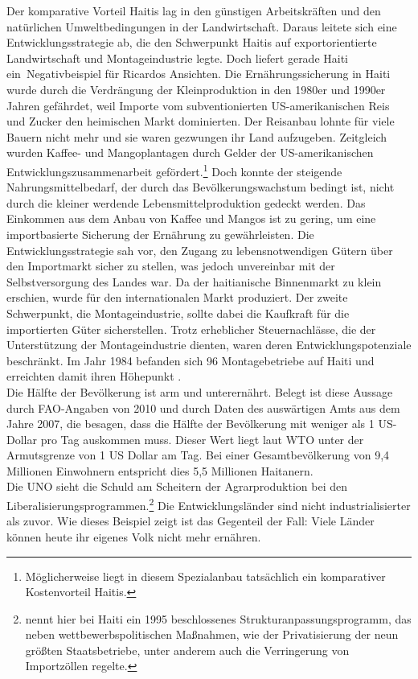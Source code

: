  Der komparative Vorteil Haitis lag in den günstigen Arbeitskräften und den natürlichen Umweltbedingungen in der Landwirtschaft. Daraus leitete sich eine Entwicklungsstrategie ab, die den Schwerpunkt Haitis auf exportorientierte Landwirtschaft und Montageindustrie legte. Doch liefert gerade Haiti ein~Negativbeispiel für Ricardos Ansichten. Die Ernährungssicherung in Haiti wurde durch die Verdrängung der Kleinproduktion in den 1980er und 1990er Jahren gefährdet, weil Importe vom subventionierten US-amerikanischen Reis und Zucker den heimischen Markt dominierten. Der Reisanbau lohnte für viele Bauern nicht mehr und sie waren gezwungen ihr Land aufzugeben. Zeitgleich wurden Kaffee- und Mangoplantagen durch Gelder der US-amerikanischen Entwicklungszusammenarbeit gefördert.\footnote{Möglicherweise liegt in diesem Spezialanbau tatsächlich ein komparativer Kostenvorteil Haitis.} Doch konnte der steigende Nahrungsmittelbedarf, der durch das Bevölkerungswachstum bedingt ist, nicht durch die kleiner werdende Lebensmittelproduktion gedeckt werden. Das Einkommen aus dem Anbau von Kaffee und Mangos ist zu gering, um eine importbasierte Sicherung der Ernährung zu gewährleisten. Die Entwicklungsstrategie sah vor, den Zugang zu lebensnotwendigen Gütern über den Importmarkt sicher zu stellen, was jedoch unvereinbar mit der Selbstversorgung des Landes war. Da der haitianische Binnenmarkt zu klein erschien, wurde für den internationalen Markt produziert. Der zweite Schwerpunkt, die Montageindustrie, sollte dabei die Kaufkraft für die importierten Güter sicherstellen. Trotz erheblicher Steuernachlässe, die der Unterstützung der Montageindustrie dienten, waren deren Entwicklungspotenziale beschränkt. Im Jahr 1984 befanden sich 96 Montagebetriebe auf Haiti und erreichten damit ihren Höhepunkt \cite[S. 69]{King.2005}. \\
%
 Die Hälfte der Bevölkerung ist arm und unterernährt. Belegt ist diese Aussage durch FAO-Angaben von 2010 und durch Daten des auswärtigen Amts aus dem Jahre 2007, die besagen, dass die Hälfte der Bevölkerung mit weniger als 1 US-Dollar pro Tag auskommen muss. Dieser Wert liegt laut WTO unter der Armutsgrenze von 1 US Dollar am Tag. Bei einer Gesamtbevölkerung von 9,4 Millionen Einwohnern entspricht dies 5,5 Millionen Haitanern.  \\
%
 Die UNO sieht die Schuld  am Scheitern der Agrarproduktion bei den Liberalisierungsprogrammen.\footnote{\cite[S. 74-77]{King.2005} nennt hier bei Haiti ein 1995 beschlossenes Strukturanpassungsprogramm, das neben wettbewerbspolitischen Maßnahmen, wie der Privatisierung der neun größten Staatsbetriebe, unter anderem auch die Verringerung von Importzöllen regelte.} Die Entwicklungsländer sind nicht industrialisierter als zuvor. Wie dieses Beispiel zeigt ist das Gegenteil der Fall: Viele Länder können heute ihr eigenes Volk nicht mehr ernähren.\\
